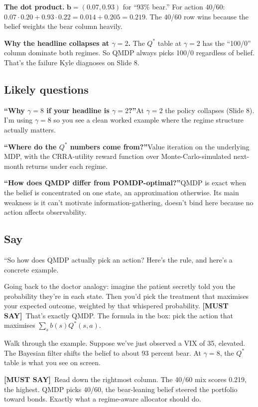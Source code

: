 \documentclass[11pt]{article}
\newcommand{\mustsay}[1]{\textcolor{must}{\textbf{[MUST SAY]}}\ #1}
\newcommand{\bel}{\mathbf{b}}
\begin{document}
\textbf{The dot product.} $\bel = (0.07, 0.93)$ for ``93\% bear.'' For action 40/60: $0.07 \cdot 0.20 + 0.93 \cdot 0.22 = 0.014 + 0.205 = 0.219$. The 40/60 row wins because the belief weights the bear column heavily.

\textbf{Why the headline collapses at $\gamma = 2$.} The $Q^*$ table at $\gamma = 2$ has the ``100/0'' column dominate both regimes. So QMDP always picks 100/0 regardless of belief. That's the failure Kyle diagnoses on Slide 8.

\subsection*{Likely questions}

\textbf{``Why $\gamma = 8$ if your headline is $\gamma = 2$?''}\quad At $\gamma = 2$ the policy collapses (Slide 8). I'm using $\gamma = 8$ so you see a clean worked example where the regime structure actually matters.

\textbf{``Where do the $Q^*$ numbers come from?''}\quad Value iteration on the underlying MDP, with the CRRA-utility reward function over Monte-Carlo-simulated next-month returns under each regime.

\textbf{``How does QMDP differ from POMDP-optimal?''}\quad QMDP is exact when the belief is concentrated on one state, an approximation otherwise. Its main weakness is it can't motivate information-gathering, doesn't bind here because no action affects observability.

\subsection*{Say}

``So how does QMDP actually pick an action? Here's the rule, and here's a concrete example.

Going back to the doctor analogy: imagine the patient secretly told you the probability they're in each state. Then you'd pick the treatment that maximises your expected outcome, weighted by that whispered probability. \mustsay{That's exactly QMDP. The formula in the box: pick the action that maximises $\sum_s b(s) Q^*(s, a)$.}

Walk through the example. Suppose we've just observed a VIX of 35, elevated. The Bayesian filter shifts the belief to about 93 percent bear. At $\gamma = 8$, the $Q^*$ table is what you see on screen.

\mustsay{Read down the rightmost column. The 40/60 mix scores 0.219, the highest. QMDP picks 40/60, the bear-leaning belief steered the portfolio toward bonds. Exactly what a regime-aware allocator should do.}
\end{document}
